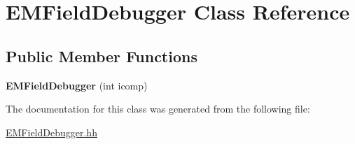 \hypertarget{classEMFieldDebugger}{\section{E\-M\-Field\-Debugger Class Reference}
\label{classEMFieldDebugger}
}
\subsection*{Public Member Functions}
\begin{DoxyCompactItemize}
\item 
\hypertarget{classEMFieldDebugger_ae695b0737ab9aff4b71e386d8e575f0f}{{\bfseries E\-M\-Field\-Debugger} (int icomp)}\label{classEMFieldDebugger_ae695b0737ab9aff4b71e386d8e575f0f}

\end{DoxyCompactItemize}


The documentation for this class was generated from the following file\-:\begin{DoxyCompactItemize}
\item 
\hyperlink{EMFieldDebugger_8hh}{E\-M\-Field\-Debugger.\-hh}\end{DoxyCompactItemize}
